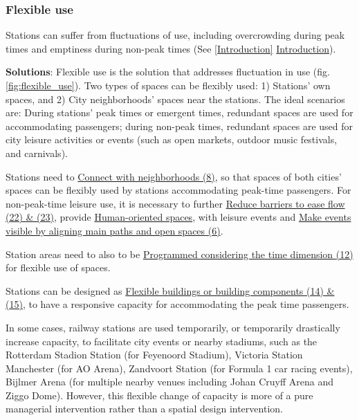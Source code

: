 \documentclass{article}
\begin{document}
\subsubsection{Flexible use}
\label{(1) Flexible use}

Stations can suffer from fluctuations of use, including overcrowding during peak times and emptiness during non-peak times (See \ref{Introduction} \hyperref[Introduction]{Introduction}).


\textbf{Solutions}: Flexible use is the solution that addresses fluctuation in use (fig. \ref{fig:flexible_use}). Two types of spaces can be flexibly used: 1) Stations' own spaces, and 2) City neighborhoods' spaces near the stations. The ideal scenarios are: During stations' peak times or emergent times, redundant spaces are used for accommodating passengers; during non-peak times, redundant spaces are used for city leisure activities or events (such as open markets, outdoor music festivals, and carnivals).

Stations need to \hyperref[Connect with neighborhoods]{Connect with neighborhoods (8)}, so that spaces of both cities' spaces can be flexibly used by stations accommodating peak-time passengers. For non-peak-time leisure use, it is necessary to further \hyperref[(22 23) Reduce barriers to ease flow]{Reduce barriers to ease flow (22) \& (23)}, provide \hyperref[(7) Human-oriented spaces]{Human-oriented spaces}, with leisure events and \hyperref[(6) Make events visible by aligning main paths and open spaces]{Make events visible by aligning main paths and open spaces (6)}.

Station areas need to also to be \hyperref[(12) Programming considering the time dimension]{Programmed considering the time dimension (12)} for flexible use of spaces.

Stations can be designed as \hyperref[(14 15) Flexible buildings or building components]{Flexible buildings or building components (14) \& (15)}, to have a responsive capacity for accommodating the peak time passengers. 

In some cases, railway stations are used temporarily, or temporarily drastically increase capacity, to facilitate city events or nearby stadiums, such as the Rotterdam Stadion Station (for Feyenoord Stadium), Victoria Station Manchester (for AO Arena), Zandvoort Station (for Formula 1 car racing events), Bijlmer Arena (for multiple nearby venues including Johan Cruyff Arena and Ziggo Dome). However, this flexible change of capacity is more of a pure managerial intervention rather than a spatial design intervention.
\end{document}
